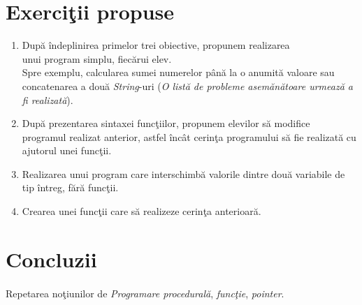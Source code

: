 \documentclass{article}
\begin{document}
\section{Exerci\c tii propuse}

\begin{enumerate}

\item Dup\u a \^ indeplinirea primelor trei obiective, propunem realizarea\\ unui program simplu, fiec\u arui elev.\\ Spre exemplu, calcularea sumei numerelor p\^ an\u a la o anumit\u a valoare sau concatenarea a dou\u a \textit{String}-uri (\textit{O list\u a de probleme asem\u an\u atoare urmeaz\u a a fi realizat\u a}).

\item Dup\u a prezentarea sintaxei func\c tiilor, propunem elevilor s\u a modifice \\programul realizat anterior, astfel \^ inc\^ at cerin\c ta programului s\u a fie realizat\u a cu ajutorul unei func\c tii.

\item Realizarea unui program care interschimb\u a valorile dintre dou\u a variabile de tip \^ intreg, f\u ar\u a func\c tii.

\item Crearea unei func\c tii care s\u a realizeze cerin\c ta anterioar\u a.

\end{enumerate}




\section{Concluzii}

\paragraph{}
Repetarea no\c tiunilor de \textit{Programare procedural\u  a}, \textit{func\c tie}, \textit{pointer}.


\end{document}
